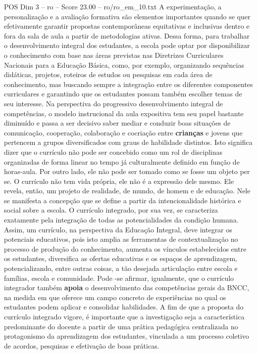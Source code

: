 \begin{textsample}{POS Dim 3 – ro – Score 23.00 – ro/ro\_em\_10.txt}
A experimentação, a personalização e a avaliação formativa são elementos importantes quando se quer efetivamente garantir propostas contemporâneas equitativas e inclusivas dentro e fora da sala de aula a partir de metodologias ativas.
Dessa forma, para trabalhar o desenvolvimento integral dos estudantes, a escola pode optar por disponibilizar o conhecimento com base nas áreas previstas nas Diretrizes Curriculares Nacionais para a Educação Básica, como, por exemplo, organizando sequências didáticas, projetos, roteiros de estudos ou pesquisas em cada área de conhecimento, mas buscando sempre a integração entre os diferentes componentes curriculares e garantindo que os estudantes possam também escolher temas de seu interesse.
Na perspectiva do progressivo desenvolvimento integral de competências, o modelo instrucional da aula expositiva tem seu papel bastante diminuído e passa a ser decisivo saber mediar e conduzir boas situações de comunicação, cooperação, colaboração e cocriação entre \textbf{crianças} e jovens que pertencem a grupos diversificados com graus de habilidade distintos.
Isto significa dizer que o currículo não pode ser concebido como um rol de disciplinas organizadas de forma linear no tempo já culturalmente definido em função de horas-aula.
Por outro lado, ele não pode ser tomado como se fosse um objeto per se.
O currículo não tem vida própria, ele não é a expressão dele mesmo.
Ele revela, então, um projeto de realidade, de mundo, de homem e de educação.
Nele se manifesta a concepção que se define a partir da intencionalidade histórica e social sobre a escola.
O currículo integrado, por sua vez, se caracteriza exatamente pela integração de todas as potencialidades da condição humana.
Assim, um currículo, na perspectiva da Educação Integral, deve integrar os potenciais educativos, pois isto amplia as ferramentas de contextualização no processo de produção do conhecimento, aumenta os vínculos estabelecidos entre os estudantes, diversifica as ofertas educativas e os espaços de aprendizagem, potencializando, entre outras coisas, a tão desejada articulação entre escola e famílias, escola e comunidade.
Pode -se afirmar, igualmente, que o currículo integrador também \textbf{apoia} o desenvolvimento das competências gerais da BNCC, na medida em que oferece um campo concreto de experiências no qual os estudantes podem aplicar e consolidar habilidades.
A fim de que a proposta do currículo integrado vigore, é importante que a investigação seja a característica predominante do docente a partir de uma prática pedagógica centralizada no protagonismo da aprendizagem dos estudantes, vinculada a um processo coletivo de acordos, pesquisas e efetivação de boas práticas.

\end{textsample}
